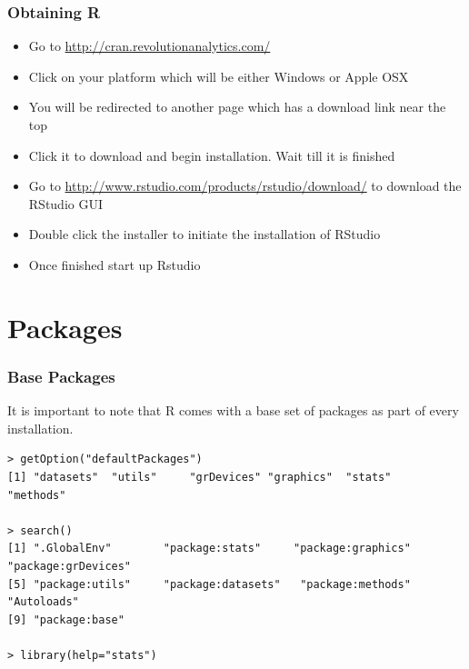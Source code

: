 \documentclass{beamer}
\begin{document}

\begin{frame}[fragile]
\frametitle{Obtaining R}
\small
\begin{itemize}
\item Go to \url{http://cran.revolutionanalytics.com/}
\item Click on your platform which will be either Windows or Apple OSX
\item You will be redirected to another page which has a download link near the top
\item Click it to download and begin installation. Wait till it is finished
\item Go to \url{http://www.rstudio.com/products/rstudio/download/} to download the RStudio GUI
\item Double click the installer to initiate the installation of RStudio
\item Once finished start up Rstudio
\end{itemize}
\end{frame}


\section{Packages}


\begin{frame}[fragile]
\frametitle{Base Packages}
It is important to note that R comes with a base set of packages as part of every installation. 
\newline
\\
\scriptsize
\begin{verbatim}
> getOption("defaultPackages")
[1] "datasets"  "utils"     "grDevices" "graphics"  "stats"     "methods"  

> search()
[1] ".GlobalEnv"        "package:stats"     "package:graphics"  "package:grDevices" 
[5] "package:utils"     "package:datasets"   "package:methods"   "Autoloads"         
[9] "package:base"     

> library(help="stats")
\end{verbatim}
\end{frame}


\end{document}
